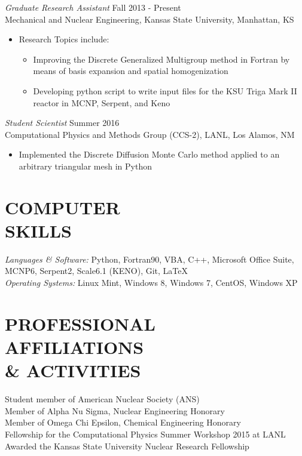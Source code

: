 \documentclass[margin, 10pt]{res} %
\begin{document}
\begin{resume}
{\sl Graduate Research Assistant} \hfill Fall 2013 - Present \\
Mechanical and Nuclear Engineering, Kansas State University, Manhattan, KS
\begin{itemize} 
\item Research Topics include:
\begin{itemize}
	\item Improving the Discrete Generalized Multigroup method in Fortran by means of basis expansion and spatial homogenization
    \item Developing python script to write input files for the KSU Triga Mark II reactor in MCNP, Serpent, and Keno
\end{itemize}
\end{itemize}

{\sl Student Scientist} \hfill Summer 2016 \\
Computational Physics and Methods Group (CCS-2), LANL, Los Alamos, NM
\begin{itemize} 
\item Implemented the Discrete Diffusion Monte Carlo method applied to an arbitrary triangular mesh in Python
\end{itemize}

\section{COMPUTER \\ SKILLS} 

{\sl Languages \& Software:} 
Python, Fortran90, VBA, C++, Microsoft Office Suite, MCNP6, Serpent2, Scale6.1 (KENO), Git, \LaTeX  \\
{\sl Operating Systems:} Linux Mint, Windows 8, Windows 7, CentOS, Windows XP

\section{PROFESSIONAL \\ AFFILIATIONS  \\ \& ACTIVITIES} 

Student member of American Nuclear Society (ANS) \\
Member of Alpha Nu Sigma, Nuclear Engineering Honorary \\
Member of Omega Chi Epsilon, Chemical Engineering Honorary\\
Fellowship for the Computational Physics Summer Workshop 2015 at LANL\\
Awarded the Kansas State University Nuclear Research Fellowship


\end{resume}
\end{document}
